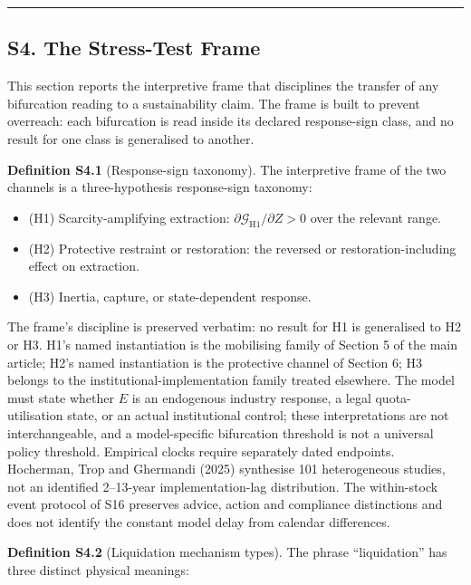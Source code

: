 \documentclass[
  10pt,
  a4paper,
]{article}
\providecommand{\tightlist}{%
  \setlength{\itemsep}{0pt}\setlength{\parskip}{0pt}}
\begin{document}
\begin{center}\rule{0.5\linewidth}{0.5pt}\end{center}

\subsection{S4. The Stress-Test Frame}\label{s4.-the-stress-test-frame}

This section reports the interpretive frame that disciplines the
transfer of any bifurcation reading to a sustainability claim. The frame
is built to prevent overreach: each bifurcation is read inside its
declared response-sign class, and no result for one class is generalised
to another.

\textbf{Definition S4.1} (Response-sign taxonomy). The interpretive
frame of the two channels is a three-hypothesis response-sign taxonomy:

\begin{itemize}
\tightlist
\item
  (H1) Scarcity-amplifying extraction:
  \(\partial\mathcal{G}_{\mathrm{H1}}/\partial Z > 0\) over the relevant
  range.
\item
  (H2) Protective restraint or restoration: the reversed or
  restoration-including effect on extraction.
\item
  (H3) Inertia, capture, or state-dependent response.
\end{itemize}

The frame's discipline is preserved verbatim: no result for H1 is
generalised to H2 or H3. H1's named instantiation is the mobilising
family of Section 5 of the main article; H2's named instantiation is the
protective channel of Section 6; H3 belongs to the
institutional-implementation family treated elsewhere. The model must
state whether \(E\) is an endogenous industry response, a legal
quota-utilisation state, or an actual institutional control; these
interpretations are not interchangeable, and a model-specific
bifurcation threshold is not a universal policy threshold. Empirical
clocks require separately dated endpoints. Hocherman, Trop and Ghermandi
(2025) synthesise 101 heterogeneous studies, not an identified
2--13-year implementation-lag distribution. The within-stock event
protocol of S16 preserves advice, action and compliance distinctions and
does not identify the constant model delay from calendar differences.

\textbf{Definition S4.2} (Liquidation mechanism types). The phrase
``liquidation'' has three distinct physical meanings:
\end{document}

